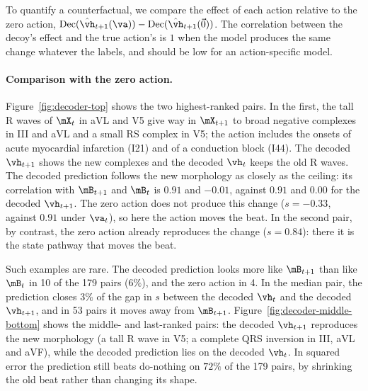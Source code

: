 To quantify a counterfactual, we compare the effect of each action relative to the zero action, $\text{Dec}(\hat{\vh}_{t+1}(\va))-\text{Dec}(\hat{\vh}_{t+1}(\vec 0))$. The correlation between the decoy's effect and the true action's is $1$ when the model produces the same change whatever the labels, and should be low for an action-specific model.

\paragraph{Comparison with the zero action.} Figure~\ref{fig:decoder-top} shows the two highest-ranked pairs. In the first, the tall R waves of $\mX_t$ in aVL and V5 give way in $\mX_{t+1}$ to broad negative complexes in III and aVL and a small RS complex in V5; the action includes the onsets of acute myocardial infarction (I21) and of a conduction block (I44). The decoded $\vh_{t+1}$ shows the new complexes and the decoded $\vh_t$ keeps the old R waves. The decoded prediction follows the new morphology as closely as the ceiling: its correlation with $\mB_{t+1}$ and $\mB_t$ is $0.91$ and $-0.01$, against $0.91$ and $0.00$ for the decoded $\vh_{t+1}$. The zero action does not produce this change ($s=-0.33$, against $0.91$ under $\va_t$), so here the action moves the beat. In the second pair, by contrast, the zero action already reproduces the change ($s=0.84$): there it is the state pathway that moves the beat.

Such examples are rare. The decoded prediction looks more like $\mB_{t+1}$ than like $\mB_t$ in 10 of the 179 pairs ($6\%$), and the zero action in 4. In the median pair, the prediction closes $3\%$ of the gap in $s$ between the decoded $\vh_t$ and the decoded $\vh_{t+1}$, and in 53 pairs it moves away from $\mB_{t+1}$. Figure~\ref{fig:decoder-middle-bottom} shows the middle- and last-ranked pairs: the decoded $\vh_{t+1}$ reproduces the new morphology (a tall R wave in V5; a complete QRS inversion in III, aVL and aVF), while the decoded prediction lies on the decoded $\vh_t$. In squared error the prediction still beats do-nothing on $72\%$ of the 179 pairs, by shrinking the old beat rather than changing its shape.

